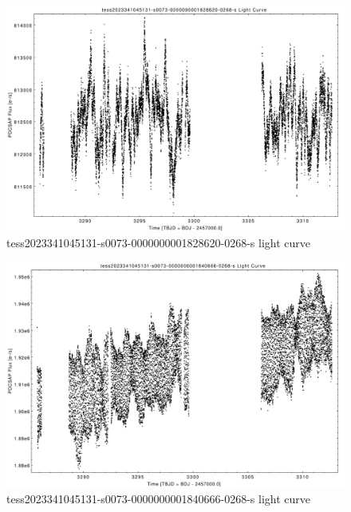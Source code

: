 \documentclass[a4paper,12pt]{article}
\begin{document}
\begin{figure}[htbp]
    \centering
    \includegraphics[width = 1\textwidth]{
      ../lightcurves/tess2023341045131-s0073-0000000001828620-0268-s.pdf}
    \caption{tess2023341045131-s0073-0000000001828620-0268-s light curve}
\end{figure}
\begin{figure}[htbp]
    \centering
    \includegraphics[width = 1\textwidth]{
      ../lightcurves/tess2023341045131-s0073-0000000001840666-0268-s.pdf}
    \caption{tess2023341045131-s0073-0000000001840666-0268-s light curve}
\end{figure}
\end{document}
